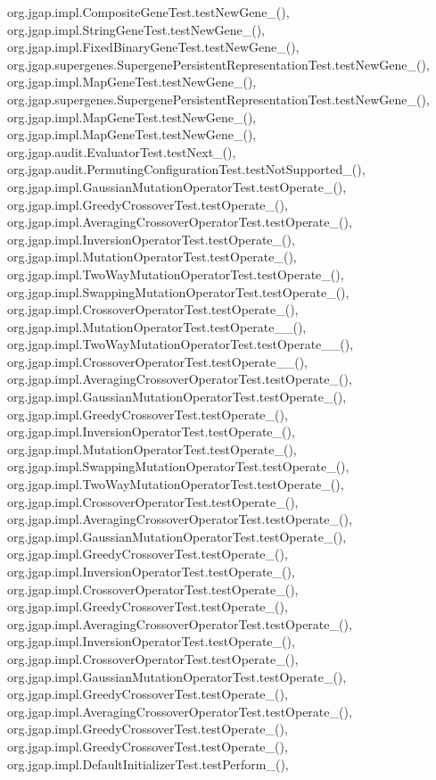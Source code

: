 org.\-jgap.\-impl.\-Composite\-Gene\-Test.\-test\-New\-Gene\-\_(), org.\-jgap.\-impl.\-String\-Gene\-Test.\-test\-New\-Gene\-\_(), org.\-jgap.\-impl.\-Fixed\-Binary\-Gene\-Test.\-test\-New\-Gene\-\_(), org.\-jgap.\-supergenes.\-Supergene\-Persistent\-Representation\-Test.\-test\-New\-Gene\-\_(), org.\-jgap.\-impl.\-Map\-Gene\-Test.\-test\-New\-Gene\-\_(), org.\-jgap.\-supergenes.\-Supergene\-Persistent\-Representation\-Test.\-test\-New\-Gene\-\_(), org.\-jgap.\-impl.\-Map\-Gene\-Test.\-test\-New\-Gene\-\_(), org.\-jgap.\-impl.\-Map\-Gene\-Test.\-test\-New\-Gene\-\_(), org.\-jgap.\-audit.\-Evaluator\-Test.\-test\-Next\-\_(), org.\-jgap.\-audit.\-Permuting\-Configuration\-Test.\-test\-Not\-Supported\-\_(), org.\-jgap.\-impl.\-Gaussian\-Mutation\-Operator\-Test.\-test\-Operate\-\_(), org.\-jgap.\-impl.\-Greedy\-Crossover\-Test.\-test\-Operate\-\_(), org.\-jgap.\-impl.\-Averaging\-Crossover\-Operator\-Test.\-test\-Operate\-\_(), org.\-jgap.\-impl.\-Inversion\-Operator\-Test.\-test\-Operate\-\_(), org.\-jgap.\-impl.\-Mutation\-Operator\-Test.\-test\-Operate\-\_(), org.\-jgap.\-impl.\-Two\-Way\-Mutation\-Operator\-Test.\-test\-Operate\-\_(), org.\-jgap.\-impl.\-Swapping\-Mutation\-Operator\-Test.\-test\-Operate\-\_(), org.\-jgap.\-impl.\-Crossover\-Operator\-Test.\-test\-Operate\-\_(), org.\-jgap.\-impl.\-Mutation\-Operator\-Test.\-test\-Operate\-\_\-\_(), org.\-jgap.\-impl.\-Two\-Way\-Mutation\-Operator\-Test.\-test\-Operate\-\_\-\_(), org.\-jgap.\-impl.\-Crossover\-Operator\-Test.\-test\-Operate\-\_\-\_(), org.\-jgap.\-impl.\-Averaging\-Crossover\-Operator\-Test.\-test\-Operate\-\_(), org.\-jgap.\-impl.\-Gaussian\-Mutation\-Operator\-Test.\-test\-Operate\-\_(), org.\-jgap.\-impl.\-Greedy\-Crossover\-Test.\-test\-Operate\-\_(), org.\-jgap.\-impl.\-Inversion\-Operator\-Test.\-test\-Operate\-\_(), org.\-jgap.\-impl.\-Mutation\-Operator\-Test.\-test\-Operate\-\_(), org.\-jgap.\-impl.\-Swapping\-Mutation\-Operator\-Test.\-test\-Operate\-\_(), org.\-jgap.\-impl.\-Two\-Way\-Mutation\-Operator\-Test.\-test\-Operate\-\_(), org.\-jgap.\-impl.\-Crossover\-Operator\-Test.\-test\-Operate\-\_(), org.\-jgap.\-impl.\-Averaging\-Crossover\-Operator\-Test.\-test\-Operate\-\_(), org.\-jgap.\-impl.\-Gaussian\-Mutation\-Operator\-Test.\-test\-Operate\-\_(), org.\-jgap.\-impl.\-Greedy\-Crossover\-Test.\-test\-Operate\-\_(), org.\-jgap.\-impl.\-Inversion\-Operator\-Test.\-test\-Operate\-\_(), org.\-jgap.\-impl.\-Crossover\-Operator\-Test.\-test\-Operate\-\_(), org.\-jgap.\-impl.\-Greedy\-Crossover\-Test.\-test\-Operate\-\_(), org.\-jgap.\-impl.\-Averaging\-Crossover\-Operator\-Test.\-test\-Operate\-\_(), org.\-jgap.\-impl.\-Inversion\-Operator\-Test.\-test\-Operate\-\_(), org.\-jgap.\-impl.\-Crossover\-Operator\-Test.\-test\-Operate\-\_(), org.\-jgap.\-impl.\-Gaussian\-Mutation\-Operator\-Test.\-test\-Operate\-\_(), org.\-jgap.\-impl.\-Greedy\-Crossover\-Test.\-test\-Operate\-\_(), org.\-jgap.\-impl.\-Averaging\-Crossover\-Operator\-Test.\-test\-Operate\-\_(), org.\-jgap.\-impl.\-Greedy\-Crossover\-Test.\-test\-Operate\-\_(), org.\-jgap.\-impl.\-Greedy\-Crossover\-Test.\-test\-Operate\-\_(), org.\-jgap.\-impl.\-Default\-Initializer\-Test.\-test\-Perform\-\_(), 